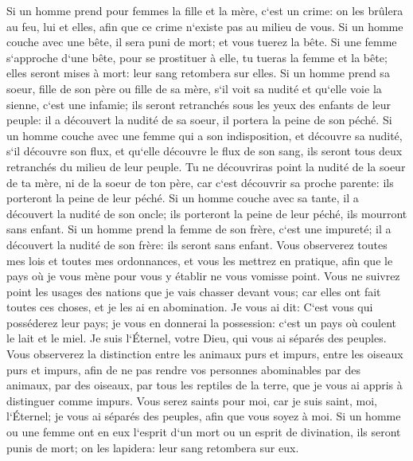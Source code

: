 \verse Si un homme prend pour femmes la fille et la mère, c`est un crime: on les brûlera au feu, lui et elles, afin que ce crime n`existe pas au milieu de vous. 
\verse Si un homme couche avec une bête, il sera puni de mort; et vous tuerez la bête. 
\verse Si une femme s`approche d`une bête, pour se prostituer à elle, tu tueras la femme et la bête; elles seront mises à mort: leur sang retombera sur elles. 
\verse Si un homme prend sa soeur, fille de son père ou fille de sa mère, s`il voit sa nudité et qu`elle voie la sienne, c`est une infamie; ils seront retranchés sous les yeux des enfants de leur peuple: il a découvert la nudité de sa soeur, il portera la peine de son péché. 
\verse Si un homme couche avec une femme qui a son indisposition, et découvre sa nudité, s`il découvre son flux, et qu`elle découvre le flux de son sang, ils seront tous deux retranchés du milieu de leur peuple. 
\verse Tu ne découvriras point la nudité de la soeur de ta mère, ni de la soeur de ton père, car c`est découvrir sa proche parente: ils porteront la peine de leur péché. 
\verse Si un homme couche avec sa tante, il a découvert la nudité de son oncle; ils porteront la peine de leur péché, ils mourront sans enfant. 
\verse Si un homme prend la femme de son frère, c`est une impureté; il a découvert la nudité de son frère: ils seront sans enfant. 
\verse Vous observerez toutes mes lois et toutes mes ordonnances, et vous les mettrez en pratique, afin que le pays où je vous mène pour vous y établir ne vous vomisse point. 
\verse Vous ne suivrez point les usages des nations que je vais chasser devant vous; car elles ont fait toutes ces choses, et je les ai en abomination. 
\verse Je vous ai dit: C`est vous qui posséderez leur pays; je vous en donnerai la possession: c`est un pays où coulent le lait et le miel. Je suis l`Éternel, votre Dieu, qui vous ai séparés des peuples. 
\verse Vous observerez la distinction entre les animaux purs et impurs, entre les oiseaux purs et impurs, afin de ne pas rendre vos personnes abominables par des animaux, par des oiseaux, par tous les reptiles de la terre, que je vous ai appris à distinguer comme impurs. 
\verse Vous serez saints pour moi, car je suis saint, moi, l`Éternel; je vous ai séparés des peuples, afin que vous soyez à moi. 
\verse Si un homme ou une femme ont en eux l`esprit d`un mort ou un esprit de divination, ils seront punis de mort; on les lapidera: leur sang retombera sur eux. 

